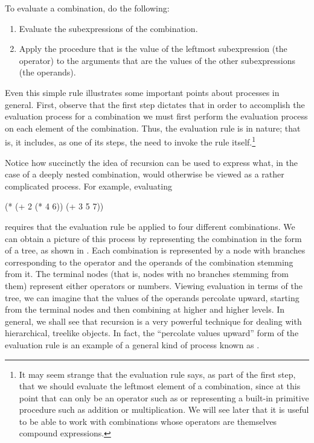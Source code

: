 To evaluate a combination, do the following:

\begin{enumerate}

\item
Evaluate the subexpressions of the combination.

\item
Apply the procedure that is the value of the leftmost subexpression (the
operator) to the arguments that are the values of the other subexpressions (the
operands).

\end{enumerate}

\noindent
Even this simple rule illustrates some important points about processes in
general.  First, observe that the first step dictates that in order to
accomplish the evaluation process for a combination we must first perform the
evaluation process on each element of the combination.  Thus, the evaluation
rule is  in nature; that is, it includes, as one of its
steps, the need to invoke the rule itself.\footnote{It may seem strange that
the evaluation rule says, as part of the first step, that we should evaluate
the leftmost element of a combination, since at this point that can only be an
operator such as \code{+} or \code{*} representing a built-in primitive
procedure such as addition or multiplication.  We will see later that it is
useful to be able to work with combinations whose operators are themselves
compound expressions.}

Notice how succinctly the idea of recursion can be used to express what, in the
case of a deeply nested combination, would otherwise be viewed as a rather
complicated process.  For example, evaluating

\begin{codeBlock}
(* (+ 2 (* 4 6))
   (+ 3 5 7))
\end{codeBlock}

\noindent
requires that the evaluation rule be applied to four different combinations.
We can obtain a picture of this process by representing the combination in the
form of a tree, as shown in .  Each combination is represented
by a node with branches corresponding to the operator and the operands of the
combination stemming from it.  The terminal nodes (that is, nodes with no
branches stemming from them) represent either operators or numbers.  Viewing
evaluation in terms of the tree, we can imagine that the values of the operands
percolate upward, starting from the terminal nodes and then combining at higher
and higher levels.  In general, we shall see that recursion is a very powerful
technique for dealing with hierarchical, treelike objects.  In fact, the
``percolate values upward'' form of the evaluation rule is an example of a
general kind of process known as .

